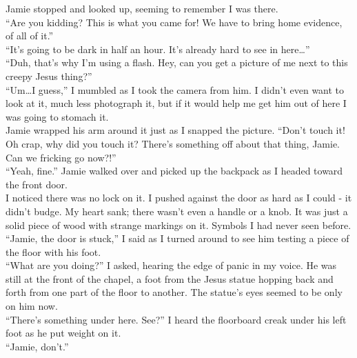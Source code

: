 \documentclass[a5paper]{scrartcl}
\begin{document}
Jamie stopped and looked up, seeming to remember I was there.\\


\enquote{Are you kidding? This is what you came for! We have to bring home evidence, of all of it.}\\


\enquote{It's going to be dark in half an hour. It's already hard to see in here\dots}\\


\enquote{Duh, that's why I'm using a flash. Hey, can you get a picture of me next to this creepy Jesus thing?}\\


\enquote{Um\dots I guess,} I mumbled as I took the camera from him. I didn't even want to look at it, much less photograph it, but if it would help me get him out of here I was going to stomach it. \\

Jamie wrapped his arm around it just as I snapped the picture.
\enquote{Don't touch it! Oh crap, why did you touch it? There's something off about that thing, Jamie. Can we fricking go now?!}\\

\enquote{Yeah, fine.} Jamie walked over and picked up the backpack as I headed toward the front door.\\


I noticed there was no lock on it. I pushed against the door as hard as I could - it didn't budge. My heart sank; there wasn't even a handle or a knob. It was just a solid piece of wood with strange markings on it. Symbols I had never seen before. \\


\enquote{Jamie, the door is stuck,} I said as I turned around to see him testing a piece of the floor with his foot.\\


\enquote{What are you doing?} I asked, hearing the edge of panic in my voice. He was still at the front of the chapel, a foot from the Jesus statue hopping back and forth from one part of the floor to another. The statue's eyes seemed to be only on him now.\\


\enquote{There's something under here. See?} I heard the floorboard creak under his left foot as he put weight on it. \\


\enquote{Jamie, don't.}\\
\end{document}

